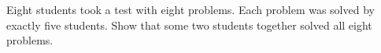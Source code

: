 Eight students took a test with eight problems. Each problem was solved by exactly five students. Show that some two students together solved all eight problems.
